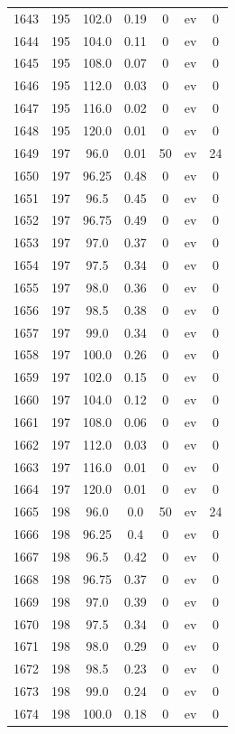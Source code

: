 \documentclass[12pt,a4paper]{article}
\begin{document}
\begin{tabular}{r|cccccc}
	1643 & 195 & 102.0 & 0.19 & 0 & ev & 0 \\
	1644 & 195 & 104.0 & 0.11 & 0 & ev & 0 \\
	1645 & 195 & 108.0 & 0.07 & 0 & ev & 0 \\
	1646 & 195 & 112.0 & 0.03 & 0 & ev & 0 \\
	1647 & 195 & 116.0 & 0.02 & 0 & ev & 0 \\
	1648 & 195 & 120.0 & 0.01 & 0 & ev & 0 \\
	1649 & 197 & 96.0 & 0.01 & 50 & ev & 24 \\
	1650 & 197 & 96.25 & 0.48 & 0 & ev & 0 \\
	1651 & 197 & 96.5 & 0.45 & 0 & ev & 0 \\
	1652 & 197 & 96.75 & 0.49 & 0 & ev & 0 \\
	1653 & 197 & 97.0 & 0.37 & 0 & ev & 0 \\
	1654 & 197 & 97.5 & 0.34 & 0 & ev & 0 \\
	1655 & 197 & 98.0 & 0.36 & 0 & ev & 0 \\
	1656 & 197 & 98.5 & 0.38 & 0 & ev & 0 \\
	1657 & 197 & 99.0 & 0.34 & 0 & ev & 0 \\
	1658 & 197 & 100.0 & 0.26 & 0 & ev & 0 \\
	1659 & 197 & 102.0 & 0.15 & 0 & ev & 0 \\
	1660 & 197 & 104.0 & 0.12 & 0 & ev & 0 \\
	1661 & 197 & 108.0 & 0.06 & 0 & ev & 0 \\
	1662 & 197 & 112.0 & 0.03 & 0 & ev & 0 \\
	1663 & 197 & 116.0 & 0.01 & 0 & ev & 0 \\
	1664 & 197 & 120.0 & 0.01 & 0 & ev & 0 \\
	1665 & 198 & 96.0 & 0.0 & 50 & ev & 24 \\
	1666 & 198 & 96.25 & 0.4 & 0 & ev & 0 \\
	1667 & 198 & 96.5 & 0.42 & 0 & ev & 0 \\
	1668 & 198 & 96.75 & 0.37 & 0 & ev & 0 \\
	1669 & 198 & 97.0 & 0.39 & 0 & ev & 0 \\
	1670 & 198 & 97.5 & 0.34 & 0 & ev & 0 \\
	1671 & 198 & 98.0 & 0.29 & 0 & ev & 0 \\
	1672 & 198 & 98.5 & 0.23 & 0 & ev & 0 \\
	1673 & 198 & 99.0 & 0.24 & 0 & ev & 0 \\
	1674 & 198 & 100.0 & 0.18 & 0 & ev & 0 \\

\end{tabular}
\end{document}

